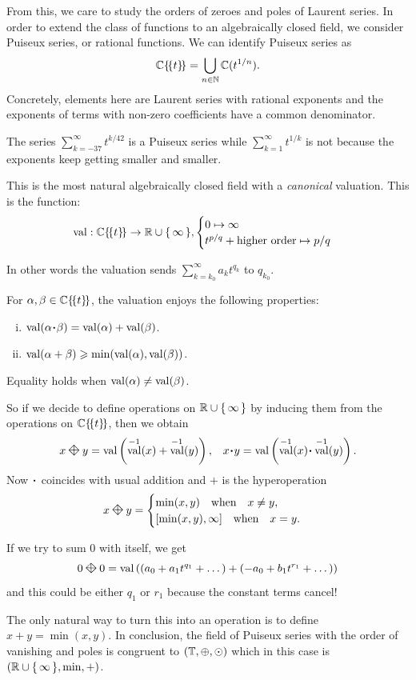 \documentclass[12pt]{memoir}
\DeclareMathOperator{\val}{val}
\newcommand{\diamondplus}{\mathbin{\rotatebox[origin=c]{45}{$\boxtimes$}}} %
\begin{document}
From this, we care to study the orders of zeroes and poles of Laurent series. In order to extend the class of functions to an algebraically closed field, we consider Puiseux series, or rational functions. We can identify Puiseux series as 
$$\mathbb{C}\{\!\{t\}\!\}=\bigcup_{n\in\mathbb{N}}\mathbb{C}(t^{1/n}).$$
Concretely, elements here are Laurent series with rational exponents and the exponents of terms with non-zero coefficients have a common denominator. 
\begin{Ex}
    The series $\sum_{k=-37}^{\infty}t^{k/42}$ is a Puiseux series while $\sum_{k=1}^\infty t^{1/k}$ is not because the exponents keep getting smaller and smaller.
\end{Ex}
This is the most natural algebraically closed field with a \emph{canonical} valuation. This is the function:
$$\val: \bC\{\!\{t\}\!\}\to\bR\cup\set{\infty},\begin{cases}
    0\mapsto\infty\\
    t^{p/q}+\text{higher order}\mapsto p/q
\end{cases}$$

In other words the valuation sends $\sum_{k=k_0}^\infty a_kt^{q_k}$ to $q_{k_0}$.
\begin{Prop}\label{prop:PropertiesOfValuation}
For $\alpha,\beta\in\mathbb{C}\{\!\{t\}\!\}$, the valuation enjoys the following properties:
\begin{enumerate}[i.]
    \item $\val(\al\.\bt)=\val(\al)+\val(\bt)$.
    \item $\val(\al+\bt)\geq\min(\val(\al),\val(\bt))$.
\end{enumerate}
Equality holds when $\val(\al)\neq\val(\bt)$.
\end{Prop}
So if we decide to define operations on $\mathbb{R}\cup\{\,\infty\,\}$ by inducing them from the operations on $\mathbb{C}\{\!\{t\}\!\}$, then we obtain
\begin{align*}
    &x\diamondplus y=\val\left(\val^{-1}(x)+\val^{-1}(y)\right),
    &x\. y=\val\left(\val^{-1}(x)\.\val^{-1}(y)\right).
\end{align*}
Now $\.$ coincides with usual addition and $+$ is the hyperoperation
$$x\diamondplus y=\begin{cases}
    \min(x,y)\word{when}x\neq y,\\
    [\min(x,y),\infty]\word{when}x=y.
\end{cases}$$
\begin{Ex}
    If we try to sum $0$ with itself, we get 
    $$0\diamondplus 0=\val\left((a_0+a_1t^{q_1}+\dots)+(-a_0+b_1t^{r_1}+\dots)\right)$$
    and this could be either $q_1$ or $r_1$ because the constant terms cancel! 
\end{Ex}
The only natural way to turn this into an operation is to define $x+y=\min(x,y)$. In conclusion, the field of Puiseux series with the order of vanishing and poles is congruent to $(\mathbb{T},\oplus,\odot)$ which in this case is $\left(\mathbb{R}\cup\{\,\infty\,\},\min,+\right)$.
\end{document}

